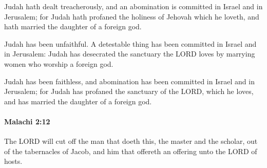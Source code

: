 			\begin{versebox}
					\item[BHS] 
					\item[LXX] 
					\item[ASV] Judah hath dealt treacherously, and an abomination is committed in Israel and in Jerusalem; for Judah hath profaned the holiness of Jehovah which he loveth, and hath married the daughter of a foreign god.
					\item[NIV] Judah has been unfaithful. A detestable thing has been committed in Israel and in Jerusalem: Judah has desecrated the sanctuary the LORD loves by marrying women who worship a foreign god.
					\item[NRSV] Judah has been faithless, and abomination has been committed in Israel and in Jerusalem; for Judah has profaned the sanctuary of the LORD, which he loves, and has married the daughter of a foreign god.
			\end{versebox}

		\paragraph{Malachi 2:12} %
			\label{MALACHI-2-12}

			The LORD will cut off the man that doeth this, the master and the scholar, out of the tabernacles of Jacob, and him that offereth an offering unto the LORD of hosts.

